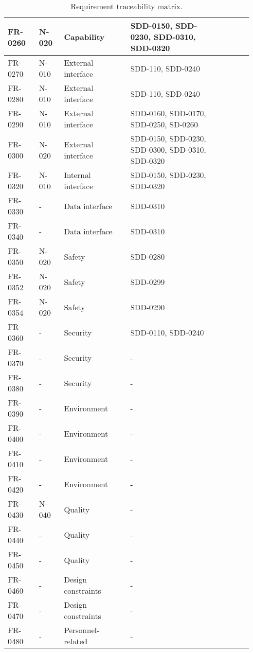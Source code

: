 \begin{sidewaystable}
\begin{table}[H]
\begin{tabular}{|p{2cm}|p{2cm}|p{3cm}|p{2cm}|p{2cm}|p{2cm}|p{2cm}|p{2cm}|p{2cm}|}
 FR-0260 & N-020 & Capability & &SDD-0150, SDD-0230, SDD-0310, SDD-0320 & & & &\\ \hline
 FR-0270 & N-010 & External interface & &SDD-110, SDD-0240& & & &\\ \hline
 FR-0280 & N-010 & External interface & &SDD-110, SDD-0240 & & & &\\ \hline
 FR-0290 & N-010 & External interface & &SDD-0160, SDD-0170, SDD-0250, SD-0260& & & &\\ \hline
 FR-0300 & N-020 & External interface & &SDD-0150, SDD-0230, SDD-0300, SDD-0310, SDD-0320& & & &\\ \hline
 FR-0320 & N-010 & Internal interface & &SDD-0150, SDD-0230, SDD-0320& & & &\\ \hline
 FR-0330 & - & Data interface & &SDD-0310 & & & &\\ \hline
 FR-0340 & - & Data interface & &SDD-0310 & & & &\\ \hline
 FR-0350 & N-020 & Safety & &SDD-0280 & & & &\\ \hline
 FR-0352 & N-020 & Safety & &SDD-0299 & & & &\\ \hline
 FR-0354 & N-020 & Safety & &SDD-0290 & & & &\\ \hline
 FR-0360 & - & Security & &SDD-0110, SDD-0240 & & & &\\ \hline
 FR-0370 & - & Security & &- & & & &\\ \hline   	
 FR-0380 & - & Security & &- & & & &\\ \hline
 FR-0390 & - & Environment & &- & & & &\\ \hline
 FR-0400 & - & Environment & &- & & & &\\ \hline
 FR-0410 & - & Environment & &- & & & &\\ \hline
 FR-0420 & - & Environment & &- & & & &\\ \hline
 FR-0430 & N-040 & Quality & &- & & & &\\ \hline
 FR-0440 & - & Quality & &- & & & &\\ \hline
 FR-0450 & - & Quality & &- & & & &\\ \hline
 FR-0460 & - & Design constraints & &- & & & &\\ \hline
 FR-0470 & - & Design constraints & &- & & & &\\ \hline
 FR-0480 & - & Personnel-related & &- & & & &\\ \hline 
 
\end{tabular}	
\caption{Requirement traceability matrix.}
\end{table}

\end{sidewaystable}